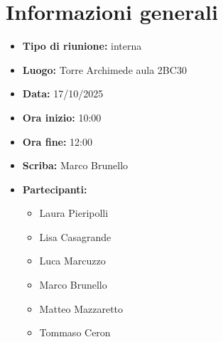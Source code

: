 \section{Informazioni generali}

\begin{itemize}
    \item \textbf{Tipo di riunione:} interna
    \item \textbf{Luogo:} Torre Archimede aula 2BC30
    \item \textbf{Data:} 17/10/2025
    \item \textbf{Ora inizio:} 10:00
    \item \textbf{Ora fine:} 12:00
    \item \textbf{Scriba:} Marco Brunello
    \item \textbf{Partecipanti:}
    \begin{itemize}
        \renewcommand{\labelitemii}{--}
        \item Laura Pieripolli
        \item Lisa Casagrande
        \item Luca Marcuzzo
        \item Marco Brunello
        \item Matteo Mazzaretto
        \item Tommaso Ceron
    \end{itemize}
\end{itemize}